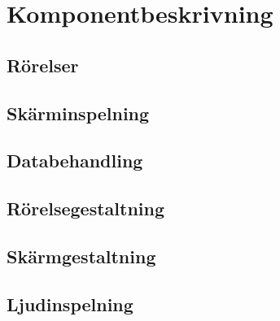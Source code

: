 \section{Komponentbeskrivning}

\subsection{Rörelser}


\subsection{Skärminspelning}


\subsection{Databehandling}
\label{sub:dataprocessing}


\subsection{Rörelsegestaltning}
\label{sub:touchmedia}


\subsection{Skärmgestaltning}
\label{sub:screenmedia}


\subsection{Ljudinspelning}

